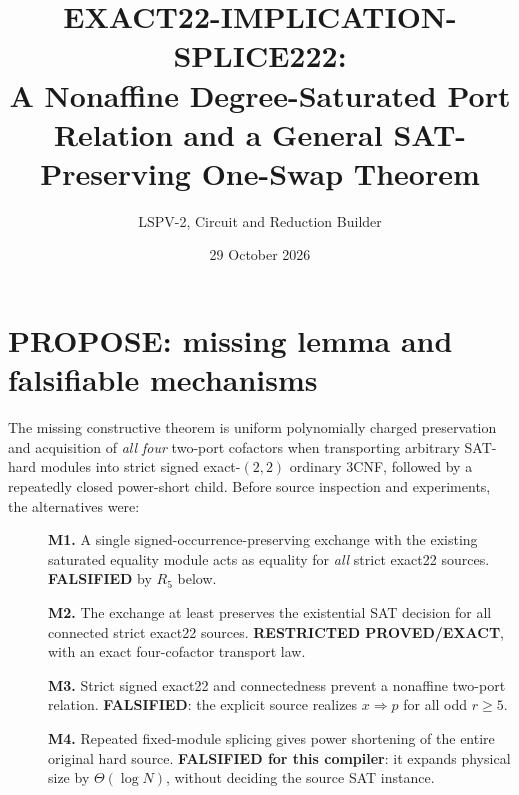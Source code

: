 \documentclass[11pt]{article}
\title{EXACT22-IMPLICATION-SPLICE222:\\A Nonaffine Degree-Saturated Port Relation and a General SAT-Preserving One-Swap Theorem}
\author{LSPV-2, Circuit and Reduction Builder}
\date{29 October 2026}
\begin{document}
\maketitle
\begin{center}\end{center}

\section{PROPOSE: missing lemma and falsifiable mechanisms}
The missing constructive theorem is uniform polynomially charged preservation and acquisition of \emph{all four} two-port cofactors when transporting arbitrary SAT-hard modules into strict signed exact-$(2,2)$ ordinary 3CNF, followed by a repeatedly closed power-short child. Before source inspection and experiments, the alternatives were:
\begin{description}
\item[]\textbf{M1.} A single signed-occurrence-preserving exchange with the existing saturated equality module acts as equality for \emph{all} strict exact22 sources. \textbf{FALSIFIED} by $R_5$ below.
\item[]\textbf{M2.} The exchange at least preserves the existential SAT decision for all connected strict exact22 sources. \textbf{RESTRICTED PROVED/EXACT}, with an exact four-cofactor transport law.
\item[]\textbf{M3.} Strict signed exact22 and connectedness prevent a nonaffine two-port relation. \textbf{FALSIFIED}: the explicit source realizes $x\Rightarrow p$ for all odd $r\ge5$.
\item[]\textbf{M4.} Repeated fixed-module splicing gives power shortening of the entire original hard source. \textbf{FALSIFIED for this compiler}: it expands physical size by $\Theta(\log N)$, without deciding the source SAT instance.
\end{description}
\end{document}
